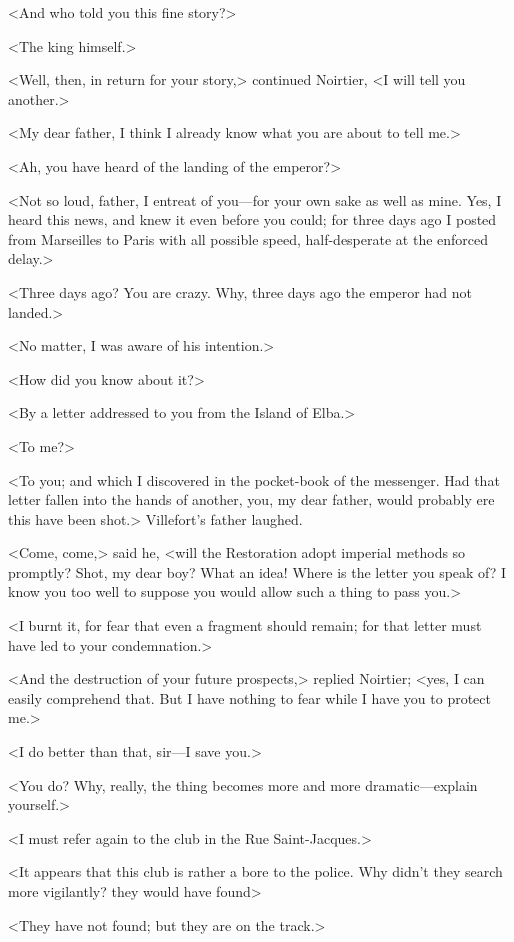 <And who told you this fine story?> 

 <The king himself.> 

 <Well, then, in return for your story,> continued Noirtier, <I will tell you another.> 

 <My dear father, I think I already know what you are about to tell me.> 

 <Ah, you have heard of the landing of the emperor?> 

 <Not so loud, father, I entreat of you—for your own sake as well as mine. Yes, I heard this news, and knew it even before you could; for three days ago I posted from Marseilles to Paris with all possible speed, half-desperate at the enforced delay.> 

 <Three days ago? You are crazy. Why, three days ago the emperor had not landed.> 

 <No matter, I was aware of his intention.> 

 <How did you know about it?> 

 <By a letter addressed to you from the Island of Elba.> 

 <To me?> 

 <To you; and which I discovered in the pocket-book of the messenger. Had that letter fallen into the hands of another, you, my dear father, would probably ere this have been shot.> Villefort's father laughed. 

 <Come, come,> said he, <will the Restoration adopt imperial methods so promptly? Shot, my dear boy? What an idea! Where is the letter you speak of? I know you too well to suppose you would allow such a thing to pass you.> 

 <I burnt it, for fear that even a fragment should remain; for that letter must have led to your condemnation.> 

 <And the destruction of your future prospects,> replied Noirtier; <yes, I can easily comprehend that. But I have nothing to fear while I have you to protect me.> 

 <I do better than that, sir—I save you.> 

 <You do? Why, really, the thing becomes more and more dramatic—explain yourself.> 

 <I must refer again to the club in the Rue Saint-Jacques.> 

 <It appears that this club is rather a bore to the police. Why didn't they search more vigilantly? they would have found\longdash> 

 <They have not found; but they are on the track.> 

